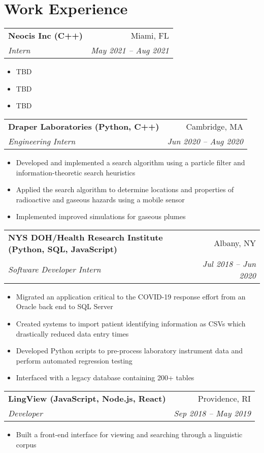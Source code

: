 \documentclass[letterpaper,10pt]{article}
\makeatletter
\newcommand{\resumeItem}[2]{
  \item\small{
    \textbf{#1}{#2 \vspace{-6pt}}
  }
}
\newcommand{\resumeSubheading}[4]{
    \vspace{1pt} 
    \begin{tabular*}{0.97\textwidth}{l@{\extracolsep{\fill}}r}
      \textbf{#1} & #2 \\
      \textit{\small#3} & \textit{\small #4} \\
    \end{tabular*}\vspace{-3pt}
}
\newcommand{\resumeSubHeadingListStart}{}
\newcommand{\resumeSubHeadingListEnd}{}
\newcommand{\resumeItemListStart}{\begin{itemize}}
\newcommand{\resumeItemListEnd}{\end{itemize}}
\makeatother
\begin{document}
\section{Work Experience}
  \resumeSubHeadingListStart
    \resumeSubheading{Neocis Inc (C++)}{Miami, FL}{Intern}{May 2021 -- Aug 2021}
      \resumeItemListStart
        \resumeItem{}
        {TBD}
        \resumeItem{}
        {TBD}
        \resumeItem{}
        {TBD}
      \resumeItemListEnd
  \resumeSubheading{Draper Laboratories (Python, C++)}
    {Cambridge, MA}{Engineering Intern}{Jun 2020 -- Aug 2020}
      \resumeItemListStart
        \resumeItem{}
        {Developed and implemented a search algorithm using a particle filter and information-theoretic search heuristics}
        \resumeItem{}
        {Applied the search algorithm to determine locations and properties of radioactive and gaseous hazards using a mobile sensor} 
        \resumeItem{}
        {Implemented improved simulations for gaseous plumes}
      \resumeItemListEnd
      \resumeSubheading{NYS DOH/Health Research Institute (Python, SQL, JavaScript)}
    {Albany, NY}{Software Developer Intern}{Jul 2018 -- Jun 2020}
      \resumeItemListStart
        \resumeItem{}
        {Migrated an application critical to the COVID-19 response effort from an Oracle back end to SQL Server}
        \resumeItem{}
        {Created systems to import patient identifying information as CSVs which drastically reduced data entry times}
        \resumeItem{}
        {Developed Python scripts to pre-process laboratory instrument data and perform automated regression testing}
        \resumeItem{}
        {Interfaced with a legacy database containing 200+ tables}
      \resumeItemListEnd
    \resumeSubheading{LingView (JavaScript, Node.js, React)}{Providence, RI}{Developer}{Sep 2018 -- May 2019}
      \resumeItemListStart
        \resumeItem{}
        {Built a front-end interface for viewing and searching through a linguistic corpus}
      \resumeItemListEnd
  \resumeSubHeadingListEnd

\end{document}
